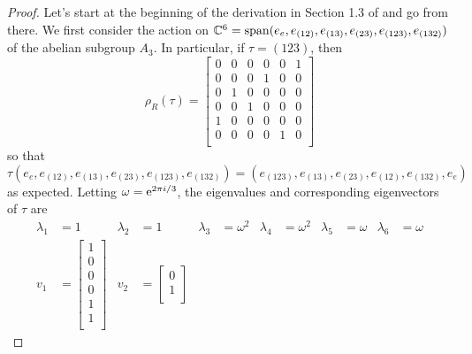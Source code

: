 \documentclass[../psets.tex]{subfiles}
\begin{document}
\begin{enumerate}
\begin{enumerate}
\begin{proof}
            Let's start at the beginning of the derivation in Section 1.3 of \textcite{bib:FultonHarris} and go from there. We first consider the action on $\C^6=\spn(e_e,e_{(12)},e_{(13)},e_{(23)},e_{(123)},e_{(132)})$ of the abelian subgroup $A_3$. In particular, if $\tau=(123)$, then
            \begin{equation*}
                \rho_R(\tau) =
                \begin{bmatrix}
                    0 & 0 & 0 & 0 & 0 & 1\\
                    0 & 0 & 0 & 1 & 0 & 0\\
                    0 & 1 & 0 & 0 & 0 & 0\\
                    0 & 0 & 1 & 0 & 0 & 0\\
                    1 & 0 & 0 & 0 & 0 & 0\\
                    0 & 0 & 0 & 0 & 1 & 0\\
                \end{bmatrix}
            \end{equation*}
            so that
            \begin{equation*}
                \tau(e_e,e_{(12)},e_{(13)},e_{(23)},e_{(123)},e_{(132)}) = (e_{(123)},e_{(13)},e_{(23)},e_{(12)},e_{(132)},e_e)
            \end{equation*}
            as expected. Letting $\omega=\e[2\pi i/3]$, the eigenvalues and corresponding eigenvectors of $\tau$ are
            \begin{align*}
                \lambda_1 &= 1&
                \lambda_2 &= 1&
                \lambda_3 &= \omega^2&
                \lambda_4 &= \omega^2&
                \lambda_5 &= \omega&
                \lambda_6 &= \omega\\
                v_1 &=
                \begin{bmatrix}
                    1\\
                    0\\
                    0\\
                    0\\
                    1\\
                    1\\
                \end{bmatrix}&
                v_2 &=
                \begin{bmatrix}
                    0\\
                    1\\

\end{bmatrix}
\end{align*}
\end{proof}
\end{enumerate}
\end{enumerate}
\end{document}
